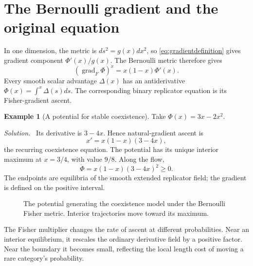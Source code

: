 \documentclass[11pt,oneside,openany]{book}
\theoremstyle{definition}
\newtheorem{example}{Example}[chapter]
\theoremstyle{remark}
\newenvironment{solution}{\par\smallskip\noindent\textit{Solution.}\ }{\par\smallskip}
\newcommand{\grad}{\operatorname{grad}}
\numberwithin{equation}{chapter}
\begin{document}
\section{The Bernoulli gradient and the original equation}
In one dimension, the metric is $ds^2=g(x)dx^2$, so \eqref{eq:gradientdefinition} gives gradient component $\Phi'(x)/g(x)$. The Bernoulli metric therefore gives
\begin{equation}\label{eq:binarynatural}
(\grad_F\Phi)^x=x(1-x)\Phi'(x).
\end{equation}
Every smooth scalar advantage $\Delta(x)$ has an antiderivative $\Phi(x)=\int^x\Delta(s)ds$. The corresponding binary replicator equation is its Fisher-gradient ascent.

\begin{example}[A potential for stable coexistence]
Take $\Phi(x)=3x-2x^2$.
\begin{solution}
Its derivative is $3-4x$. Hence natural-gradient ascent is
\[
x'=x(1-x)(3-4x),
\]
the recurring coexistence equation. The potential has its unique interior maximum at $x=3/4$, with value $9/8$. Along the flow,
\[
\dot\Phi=x(1-x)(3-4x)^2\geq0.
\]
The endpoints are equilibria of the smooth extended replicator field; the gradient is defined on the positive interval.
\end{solution}
\end{example}

\begin{figure}[htbp]
\centering
{}
\caption{The potential generating the coexistence model under the Bernoulli Fisher metric. Interior trajectories move toward its maximum.}
\end{figure}

The Fisher multiplier changes the rate of ascent at different probabilities. Near an interior equilibrium, it rescales the ordinary derivative field by a positive factor. Near the boundary it becomes small, reflecting the local length cost of moving a rare category's probability.
\end{document}
